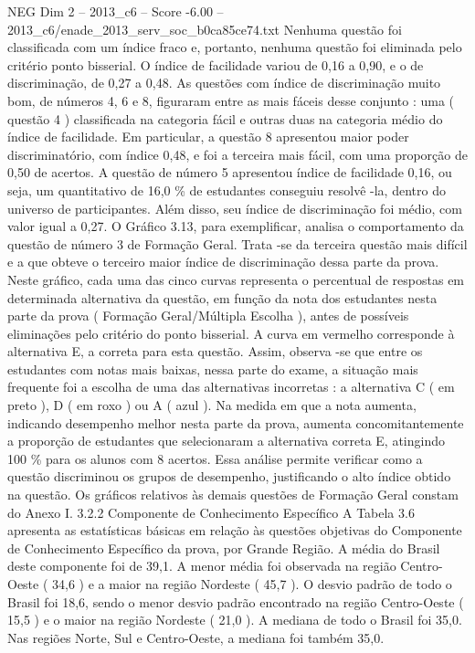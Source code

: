\begin{textsample}{NEG Dim 2 – 2013\_c6 – Score -6.00 – 2013\_c6/enade\_2013\_serv\_soc\_b0ca85ce74.txt}
Nenhuma questão foi classificada com um índice fraco e, portanto, nenhuma questão foi eliminada pelo critério ponto bisserial.
O índice de facilidade variou de 0,16 a 0,90, e o de discriminação, de 0,27 a 0,48.
As questões com índice de discriminação muito bom, de números 4, 6 e 8, figuraram entre as mais fáceis desse conjunto : uma ( questão 4 ) classificada na categoria fácil e outras duas na categoria médio do índice de facilidade.
Em particular, a questão 8 apresentou maior poder discriminatório, com índice 0,48, e foi a terceira mais fácil, com uma proporção de 0,50 de acertos.
A questão de número 5 apresentou índice de facilidade 0,16, ou seja, um quantitativo de 16,0 \% de estudantes conseguiu resolvê -la, dentro do universo de participantes.
Além disso, seu índice de discriminação foi médio, com valor igual a 0,27.
O Gráfico 3.13, para exemplificar, analisa o comportamento da questão de número 3 de Formação Geral.
Trata -se da terceira questão mais difícil e a que obteve o terceiro maior índice de discriminação dessa parte da prova.
Neste gráfico, cada uma das cinco curvas representa o percentual de respostas em determinada alternativa da questão, em função da nota dos estudantes nesta parte da prova ( Formação Geral/Múltipla Escolha ), antes de possíveis eliminações pelo critério do ponto bisserial.
A curva em vermelho corresponde à alternativa E, a correta para esta questão.
Assim, observa -se que entre os estudantes com notas mais baixas, nessa parte do exame, a situação mais frequente foi a escolha de uma das alternativas incorretas : a alternativa C ( em preto ), D ( em roxo ) ou A ( azul ).
Na medida em que a nota aumenta, indicando desempenho melhor nesta parte da prova, aumenta concomitantemente a proporção de estudantes que selecionaram a alternativa correta E, atingindo 100 \% para os alunos com 8 acertos.
Essa análise permite verificar como a questão discriminou os grupos de desempenho, justificando o alto índice obtido na questão.
Os gráficos relativos às demais questões de Formação Geral constam do Anexo I. 3.2.2 Componente de Conhecimento Específico A Tabela 3.6 apresenta as estatísticas básicas em relação às questões objetivas do Componente de Conhecimento Específico da prova, por Grande Região.
A média do Brasil deste componente foi de 39,1.
A menor média foi observada na região Centro-Oeste ( 34,6 ) e a maior na região Nordeste ( 45,7 ).
O desvio padrão de todo o Brasil foi 18,6, sendo o menor desvio padrão encontrado na região Centro-Oeste ( 15,5 ) e o maior na região Nordeste ( 21,0 ).
A mediana de todo o Brasil foi 35,0.
Nas regiões Norte, Sul e Centro-Oeste, a mediana foi também 35,0.

\end{textsample}
